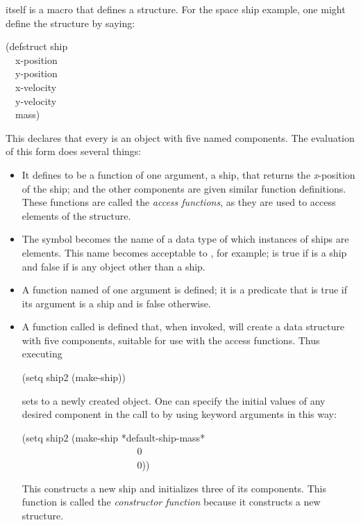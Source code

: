  itself is a macro that defines a structure.  For the
space ship example, one might define the structure by saying:
\begin{lisp}
(defstruct ship \\
~~x-position \\
~~y-position \\
~~x-velocity \\
~~y-velocity \\
~~mass)
\end{lisp}
This declares that every  is an object with five named components.
The evaluation of this form does several things:
\begin{itemize}
\item
It defines  to be a function
of one argument, a ship, that returns the {\it x}-position
of the ship; 
and the other components are given similar function definitions.
These functions are called the {\it access functions}, as they
are used to access elements of the structure.

\item
The symbol  becomes the name of a data type of which instances
of ships are elements.  This name becomes acceptable to ,
for example;  is true if  is a ship
and false if  is any object other than a ship.

\item
A function named  of one argument is defined; it is a predicate
that is true if its argument is a ship and is false otherwise.

\item
A function called  is defined that, when invoked,
will create a data structure with five components, suitable for use with
the access functions.  Thus executing
\begin{lisp}
(setq ship2 (make-ship))
\end{lisp}
sets  to a newly created  object.
One can specify the initial values of any desired component in the call
to  by using keyword arguments in this way:
\begin{lisp}
(setq ship2 (make-ship  *default-ship-mass* \\
~~~~~~~~~~~~~~~~~~~~~~~ 0 \\
~~~~~~~~~~~~~~~~~~~~~~~ 0))
\end{lisp}
This constructs a new ship and initializes three of its components.
This function is called the {\it constructor function}
because it constructs a new structure.


\end{itemize}

